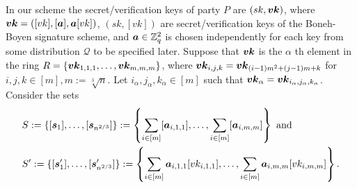 %
%
%

In our scheme the secret/verification keys of party $P$ are $(sk,{\boldsymbol{vk}})$, where ${\boldsymbol{vk}}=([vk],[{\boldsymbol{a}}],{\boldsymbol{a}}[vk])$, $(sk,[vk])$ are secret/verification keys of the Boneh-Boyen signature scheme, and ${\boldsymbol{a}}\in\mathbb{Z}_q^2$ is chosen independently for each key from some distribution $\mathcal{Q}$ to be specified later. Suppose that ${\boldsymbol{vk}}$ is the $\alpha$ th element in the ring $R=\{{\boldsymbol{vk}}_{1,1,1},\ldots,{\boldsymbol{vk}}_{m,m,m}\}$, where ${\boldsymbol{vk}}_{i,j,k}={\boldsymbol{vk}}_{(i-1)m^2+(j-1)m+k}$ for $i,j,k\in[m],m:=\sqrt[3]{n}$. Let $i_\alpha,j_\alpha,k_\alpha\in[m]$ such that ${\boldsymbol{vk}}_\alpha = {\boldsymbol{vk}}_{i_\alpha,j_\alpha,k_\alpha}$. Consider the sets
\begin{align*}
&S:=\{[{\boldsymbol{s}}_1],\ldots,[{\boldsymbol{s}}_{n^{2/3}}]\}:=\left\{\sum_{i\in[m]}[{\boldsymbol{a}}_{i,1,1}],\ldots,\sum_{i\in[m]}[{\boldsymbol{a}}_{i,m,m}]\right\}\text{ and }\\
&S':=\{[{\boldsymbol{s}}'_1],\ldots,[{\boldsymbol{s}}'_{n^{2/3}}]\}:=\left\{\sum_{i\in[m]}{\boldsymbol{a}}_{i,1,1}[vk_{i,1,1}],\ldots,\sum_{i\in[m]}{\boldsymbol{a}}_{i,m,m}[vk_{i,m,m}]\right\}.
\end{align*}


